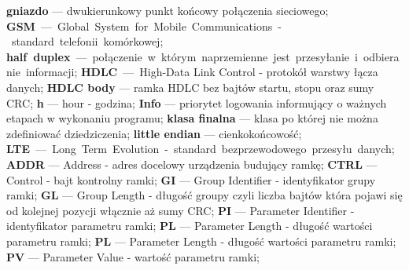 \textbf{gniazdo} --- dwukierunkowy punkt końcowy połączenia sieciowego;\newline
\textbf{GSM} --- Global System for Mobile Communications - standard telefonii komórkowej;\newline
\textbf{half duplex} --- połączenie w którym naprzemienne jest przesyłanie i odbieranie informacji;\newline
\textbf{HDLC} --- High-Data Link Control - protokół warstwy łącza danych;\newline
\textbf{HDLC body} --- ramka HDLC bez bajtów startu, stopu oraz sumy CRC;\newline
\textbf{h} --- hour - godzina;\newline
\textbf{Info} --- priorytet logowania informujący o ważnych etapach w wykonaniu programu;\newline
\textbf{klasa finalna} --- klasa po której nie można zdefiniować dziedziczenia;\newline
\textbf{little endian} --- cienkokońcowość;\newline
\textbf{LTE} --- Long Term Evolution - standard bezprzewodowego przesyłu danych;\newline
\textbf{ADDR} --- Address - adres docelowy urządzenia budujący ramkę;\newline
\textbf{CTRL} --- Control - bajt kontrolny ramki;\newline
\textbf{GI} --- Group Identifier - identyfikator grupy ramki;\newline
\textbf{GL} --- Group Length - długość groupy czyli liczba bajtów która pojawi się od kolejnej pozycji włącznie aż sumy CRC;\newline
\textbf{PI} --- Parameter Identifier - identyfikator parametru ramki;\newline
\textbf{PL} --- Parameter Length - długość wartości parametru ramki;\newline
\textbf{PL} --- Parameter Length - długość wartości parametru ramki;\newline
\textbf{PV} --- Parameter Value - wartość parametru ramki;\newline

\newpage
